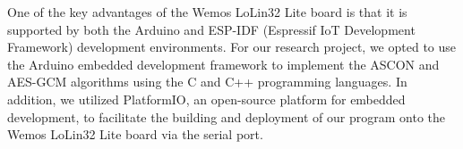 One of the key advantages of the Wemos LoLin32 Lite board is that it is supported by both the Arduino and ESP-IDF (Espressif IoT Development Framework) development environments. For our research project, we opted to use the Arduino embedded development framework to implement the ASCON and AES-GCM algorithms using the C and C++ programming languages. In addition, we utilized PlatformIO, an open-source platform for embedded development, to facilitate the building and deployment of our program onto the Wemos LoLin32 Lite board via the serial port.